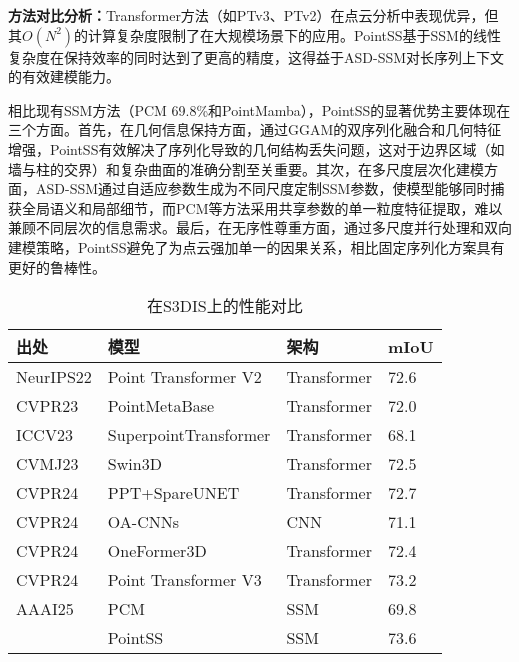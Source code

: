 \documentclass[preprint,12pt]{elsarticle}
\begin{document}
\textbf{方法对比分析：}Transformer方法（如PTv3、PTv2）在点云分析中表现优异，但其$O(N^2)$的计算复杂度限制了在大规模场景下的应用。PointSS基于SSM的线性复杂度在保持效率的同时达到了更高的精度，这得益于ASD-SSM对长序列上下文的有效建模能力。

相比现有SSM方法（PCM 69.8\%和PointMamba），PointSS的显著优势主要体现在三个方面。首先，在几何信息保持方面，通过GGAM的双序列化融合和几何特征增强，PointSS有效解决了序列化导致的几何结构丢失问题，这对于边界区域（如墙与柱的交界）和复杂曲面的准确分割至关重要。其次，在多尺度层次化建模方面，ASD-SSM通过自适应参数生成为不同尺度定制SSM参数，使模型能够同时捕获全局语义和局部细节，而PCM等方法采用共享参数的单一粒度特征提取，难以兼顾不同层次的信息需求。最后，在无序性尊重方面，通过多尺度并行处理和双向建模策略，PointSS避免了为点云强加单一的因果关系，相比固定序列化方案具有更好的鲁棒性。
\begin{table}[htbp!]
	\caption{在S3DIS上的性能对比}
\label{tab:s3dis}
	\begin{tabular}{@{}llll@{}}
		\toprule
		\textbf{出处}  & \textbf{模型}           & \textbf{架构} & \textbf{mIoU} \\ \midrule
		NeurIPS22 & Point Transformer V2\cite{ptv2}  & Transformer & 72.6          \\
		CVPR23     & PointMetaBase\cite{pmb}         & Transformer & 72.0          \\
		ICCV23     & SuperpointTransformer\cite{spt} & Transformer & 68.1          \\
		CVMJ23     & Swin3D\cite{Swin3D}                & Transformer & 72.5          \\
		CVPR24     & PPT+SpareUNET\cite{ppt}         & Transformer & 72.7          \\
		CVPR24     & OA-CNNs\cite{oacnn}               & CNN         & 71.1          \\
		CVPR24     & OneFormer3D\cite{OneFormer3D}           & Transformer & 72.4          \\
		CVPR24     & Point Transformer V3\cite{ptv3}           & Transformer & 73.2          \\
		AAAI25    & PCM\cite{pcm}                   & SSM         & 69.8         \\
		& PointSS               &SSM           & 73.6          \\ \bottomrule
	\end{tabular}
		\centering
	

\end{table}
\end{document}
